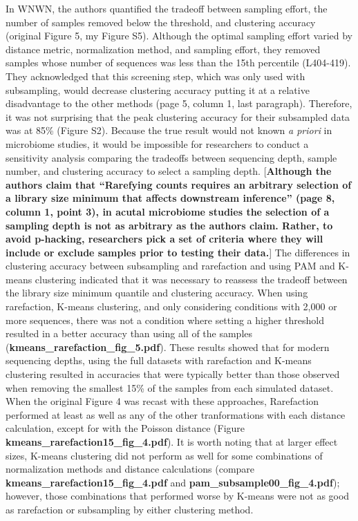 \documentclass[
]{article}
\begin{document}
In WNWN, the authors quantified the tradeoff between sampling effort,
the number of samples removed below the threshold, and clustering
accuracy (original Figure 5, my Figure S5). Although the optimal
sampling effort varied by distance metric, normalization method, and
sampling effort, they removed samples whose number of sequences was less
than the 15th percentile (L404-419). They acknowledged that this
screening step, which was only used with subsampling, would decrease
clustering accuracy putting it at a relative disadvantage to the other
methods (page 5, column 1, last paragraph). Therefore, it was not
surprising that the peak clustering accuracy for their subsampled data
was at 85\% (Figure S2). Because the true result would not known \emph{a
priori} in microbiome studies, it would be impossible for researchers to
conduct a sensitivity analysis comparing the tradeoffs between
sequencing depth, sample number, and clustering accuracy to select a
sampling depth. {[}\textbf{Although the authors claim that ``Rarefying
counts requires an arbitrary selection of a library size minimum that
affects downstream inference'' (page 8, column 1, point 3), in acutal
microbiome studies the selection of a sampling depth is not as arbitrary
as the authors claim. Rather, to avoid p-hacking, researchers pick a set
of criteria where they will include or exclude samples prior to testing
their data.}{]} The differences in clustering accuracy between
subsampling and rarefaction and using PAM and K-means clustering
indicated that it was necessary to reassess the tradeoff between the
library size minimum quantile and clustering accuracy. When using
rarefaction, K-means clustering, and only considering conditions with
2,000 or more sequences, there was not a condition where setting a
higher threshold resulted in a better accuracy than using all of the
samples (\textbf{kmeans\_rarefaction\_fig\_5.pdf}). These results showed
that for modern sequencing depths, using the full datasets with
rarefaction and K-means clustering resulted in accuracies that were
typically better than those observed when removing the smallest 15\% of
the samples from each simulated dataset. When the original Figure 4 was
recast with these approaches, Rarefaction performed at least as well as
any of the other tranformations with each distance calculation, except
for with the Poisson distance (Figure
\textbf{kmeans\_rarefaction15\_fig\_4.pdf}). It is worth noting that at
larger effect sizes, K-means clustering did not perform as well for some
combinations of normalization methods and distance calculations (compare
\textbf{kmeans\_rarefaction15\_fig\_4.pdf} and
\textbf{pam\_subsample00\_fig\_4.pdf}); however, those combinations that
performed worse by K-means were not as good as rarefaction or
subsampling by either clustering method.
\end{document}
